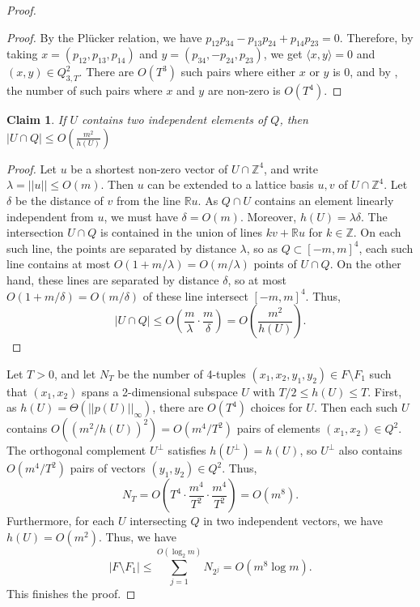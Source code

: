 \documentclass[11pt]{article}
\theoremstyle{plain}
\newtheorem{claim}[theorem]{Claim}
\theoremstyle{definition}
\begin{document}
\begin{proof}
		\begin{proof}
			By the Pl\"ucker relation, we have $p_{12}p_{34}-p_{13}p_{24}+p_{14}p_{23}=0$. Therefore, by taking $x=(p_{12},p_{13},p_{14})$ and $y=(p_{34},-p_{24},p_{23})$, we get $\langle x,y\rangle=0$ and $(x,y)\in Q_{3,T}^2$. There are $O(T^3)$ such pairs where either $x$ or $y$ is 0, and by , the number of such pairs where $x$ and $y$ are non-zero is $O(T^4)$.
		\end{proof}
		
		\begin{claim}
			If $U$ contains two independent elements of $Q$, then $|U\cap Q|\leq O(\frac{m^2}{h(U)})$
		\end{claim}
		
		\begin{proof}
			Let $u$ be a shortest non-zero vector of $U\cap \mathbb{Z}^4$, and write $\lambda=||u||\leq O(m)$. Then $u$ can be extended to a lattice basis $u,v$ of $U\cap \mathbb{Z}^4$. Let $\delta$ be the distance of $v$ from the line $\mathbb{R}u$. As $Q\cap U$ contains an element linearly independent from $u$, we must have $\delta=O(m)$. Moreover, $h(U)=\lambda \delta$. The intersection $U\cap Q$ is contained in the union of lines $kv+\mathbb{R}u$ for $k\in \mathbb{Z}$. On each such line, the points are separated by distance $\lambda$, so as $Q\subset [-m,m]^4$, each such line contains at most $O(1+m/\lambda)=O(m/\lambda)$ points of $U\cap Q$. On the other hand, these lines are separated by distance $\delta$, so at most $O(1+m/\delta)=O(m/\delta)$ of these line intersect $[-m,m]^4$. Thus, 
			$$|U\cap Q|\leq O\left(\frac{m}{\lambda}\cdot\frac{m}{\delta}\right)=O\left(\frac{m^2}{h(U)}\right).$$
		\end{proof}
		
		Let $T>0$, and let $N_T$ be the number of 4-tuples  $(x_1,x_2,y_1,y_2)\in F\setminus F_1$ such that $(x_1,x_2)$ spans a 2-dimensional subspace $U$ with $T/2\leq h(U)\leq T$. First, as $h(U)=\Theta(||p(U)||_{\infty})$, there are $O(T^4)$ choices for $U$. Then each such $U$ contains $O((m^2/h(U))^2)=O(m^4/T^2)$ pairs of elements $(x_1,x_2)\in Q^2$. The orthogonal complement $U^{\perp}$ satisfies $h(U^{\perp})=h(U)$, so $U^{\perp}$ also contains $O(m^4/T^2)$ pairs of vectors $(y_1,y_2)\in Q^2$. Thus, 
		$$N_{T}=O\left(T^4\cdot \frac{m^4}{T^2}\cdot \frac{m^4}{T^2}\right)=O(m^8).$$
		Furthermore, for each $U$ intersecting $Q$ in two independent vectors, we have $h(U)=O(m^2)$. Thus, we have
		$$|F\setminus F_1|\leq \sum_{j=1}^{O(\log_2 m)} N_{2^j}=O(m^8\log m).$$
		This finishes the proof.
	\end{proof}
	
\end{document}
